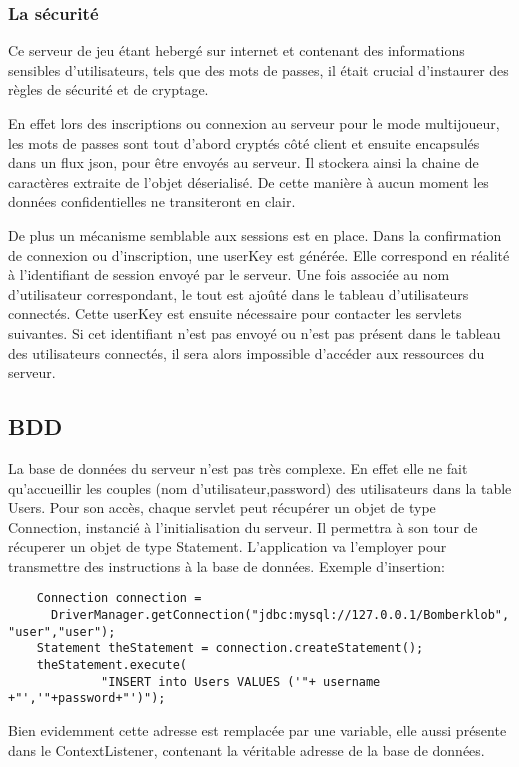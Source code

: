 		
	\subsubsection{La sécurité}
	
		Ce serveur de jeu étant hebergé sur internet et contenant des informations
		sensibles d'utilisateurs, tels que des mots de passes, il était crucial
		d'instaurer des règles de sécurité et de cryptage. 
		
		En effet lors des inscriptions ou connexion au serveur pour le mode
		multijoueur, les mots de passes sont tout d'abord cryptés côté client et
		ensuite encapsulés dans un flux \gls{json}, pour être envoyés au serveur. Il
		stockera ainsi la chaine de caractères extraite de l'objet déserialisé. De cette
		manière à aucun moment les données confidentielles ne transiteront en clair.
		
		De plus un mécanisme semblable aux sessions est en place. Dans la
		confirmation de connexion ou d'inscription, une userKey est générée. Elle correspond en
		réalité à l'identifiant de session envoyé par le serveur. Une fois associée
		au nom d'utilisateur correspondant, le tout est ajoûté dans le tableau
		d'utilisateurs connectés.
		Cette userKey est ensuite nécessaire pour contacter les \glspl{servlet}
		suivantes. Si cet identifiant n'est pas envoyé ou n'est pas présent dans le tableau des
		utilisateurs connectés, il sera alors impossible d'accéder aux ressources du
		serveur.
		
\subsection{BDD}

	La base de données du serveur n'est pas très complexe. En effet elle ne fait
	qu'accueillir les couples (nom d'utilisateur,password) des utilisateurs dans la
	table Users. 
	Pour son accès, chaque \gls{servlet} peut récupérer un objet de type
	Connection, instancié à l'initialisation du serveur. Il permettra à son tour
	de récuperer un objet de type Statement. L'application va l'employer pour
	transmettre des instructions à la base de données.
	Exemple d'insertion: 
		
	\begin{verbatim}
	Connection connection = 
	  DriverManager.getConnection("jdbc:mysql://127.0.0.1/Bomberklob", "user","user");
	Statement theStatement = connection.createStatement();
	theStatement.execute(
		     "INSERT into Users VALUES ('"+ username +"','"+password+"')");
	\end{verbatim}
	
	Bien evidemment cette adresse est remplacée par une variable, elle aussi
	présente dans le ContextListener, contenant la véritable adresse de la base de
	données.
	
	
	
	